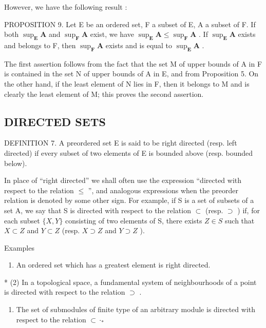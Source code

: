 However, we have the following result :

PROPOSITION 9. Let E be an ordered set, F a subset of E, A a subset of F. If both \(\sup_{\mathbf{E}}\mathbf{A}\) and \(\sup_{\mathbf{F}}\mathbf{A}\) exist, we have \(\sup_{\mathbf{E}}\mathbf{A} \leqslant \sup_{\mathbf{F}}\mathbf{A}\) . If \(\sup_{\mathbf{E}}\mathbf{A}\) exists and belongs to F, then \(\sup_{\mathbf{F}}\mathbf{A}\) exists and is equal to \(\sup_{\mathbf{E}}\mathbf{A}\) .

The first assertion follows from the fact that the set M of upper bounds of A in F is contained in the set N of upper bounds of A in E, and from Proposition 5. On the other hand, if the least element of N lies in F, then it belongs to M and is clearly the least element of M; this proves the second assertion.

\subsection{DIRECTED SETS}

DEFINITION 7. A preordered set E is said to be right directed (resp. left directed) if every subset of two elements of E is bounded above (resp. bounded below).

In place of ``right directed'' we shall often use the expression ``directed with respect to the relation \(\leqslant\) '', and analogous expressions when the preorder relation is denoted by some other sign. For example, if S is a set of subsets of a set A, we say that S is directed with respect to the relation \(\subset\) (resp. \(\supset\) ) if, for each subset \(\{X, Y\}\) consisting of two elements of S, there exists \(Z \in S\) such that \(X \subset Z\) and \(Y \subset Z\) (resp. \(X \supset Z\) and \(Y \supset Z\) ).

Examples

\begin{enumerate}
\def\labelenumi{(\arabic{enumi})}
\tightlist
\item
  An ordered set which has a greatest element is right directed.
\end{enumerate}

* (2) In a topological space, a fundamental system of neighbourhoods of a point is directed with respect to the relation \(\supset\) .

\begin{enumerate}
\def\labelenumi{(\arabic{enumi})}
\setcounter{enumi}{2}
\tightlist
\item
  The set of submodules of finite type of an arbitrary module is directed with respect to the relation \(\subset\cdot_{*}\)
\end{enumerate}

